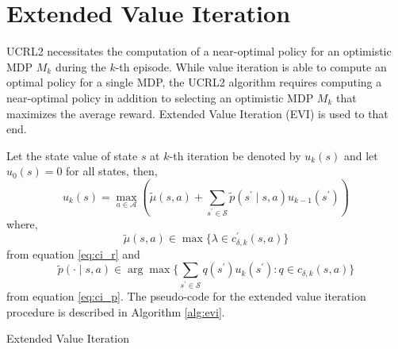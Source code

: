 \section{Extended Value Iteration}

UCRL2 necessitates the computation of a near-optimal policy for an optimistic MDP $M_k$ during the $k$-th episode.
While value iteration is able to compute an optimal policy for a single MDP, the UCRL2 algorithm requires computing a near-optimal policy in addition to selecting an optimistic MDP $M_k$ that maximizes the average reward.
Extended Value Iteration (EVI) is used to that end.

Let the state value of state $s$ at $k$-th iteration be denoted by $u_k(s)$ and let $u_0(s) = 0$ for all states, then,
\begin{equation}
    u_k(s) = \max_{a \in \mathcal{A}} \left( \tilde{\mu}(s,a) + \sum_{s^\prime \in \mathcal{S}} {\tilde{p}(s^\prime \mid s, a) u_{k-1}(s^\prime)} \right)
\end{equation}
where, 
$$\tilde{\mu}(s,a) \in \max \{ \lambda \in c^\prime_{\delta, k} (s,a) \}$$
from equation \ref{eq:ci_r} and 
$$\tilde{p}(\cdot \mid s, a) \in \arg\max \{ \sum_{s^\prime \in \mathcal{S}} {q(s^\prime) u_k(s^\prime) : q \in c_{\delta, k} (s,a)} \}$$ 
from equation  \ref{eq:ci_p}.
The pseudo-code for the extended value iteration procedure is described in Algorithm \ref{alg:evi}.

\begin{algorithm}
\caption{Extended Value Iteration}\label{alg:evi}



\BlankLine
{}
\BlankLine
{}
\end{algorithm}

